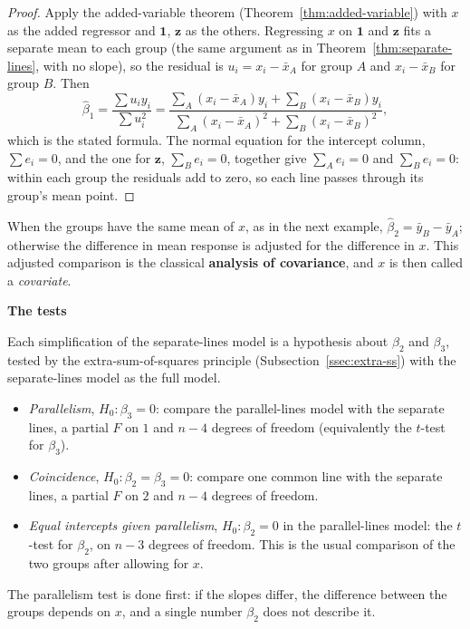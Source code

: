\documentclass[11pt,a4paper]{article}
\numberwithin{equation}{section}
\theoremstyle{definition}
\newcommand{\subhead}[1]{%
  \par\medskip\noindent\textbf{#1}\par\nobreak\smallskip}
\begin{document}
\begin{proof}
Apply the added-variable theorem (Theorem~\ref{thm:added-variable}) with $x$ as the added regressor and
$\mathbf{1}$, $\mathbf{z}$ as the others. Regressing $x$ on $\mathbf{1}$ and $\mathbf{z}$ fits a separate mean to each group
(the same argument as in Theorem~\ref{thm:separate-lines}, with no slope), so the residual is
$u_i = x_i - \bar x_A$ for group $A$ and $x_i - \bar x_B$ for group $B$. Then
\[
\hat\beta_1 = \frac{\sum u_iy_i}{\sum u_i^2} = \frac{\sum_A(x_i - \bar x_A)y_i + \sum_B(x_i - \bar x_B)y_i}{\sum_A(x_i - \bar x_A)^2 + \sum_B(x_i - \bar x_B)^2} ,
\]
which is the stated formula. The normal equation for the intercept column, $\sum e_i = 0$, and the one for
$\mathbf{z}$, $\sum_B e_i = 0$, together give $\sum_A e_i = 0$ and $\sum_B e_i = 0$: within each group the residuals add to
zero, so each line passes through its group's mean point.
\end{proof}

When the groups have the same mean of $x$, as in the next example, $\hat\beta_2 = \bar y_B - \bar y_A$; otherwise the
difference in mean response is adjusted for the difference in $x$. This adjusted comparison is the classical
\textbf{analysis of covariance}, and $x$ is then called a \emph{covariate}.

\subhead{The tests}
Each simplification of the separate-lines model is a hypothesis about $\beta_2$ and $\beta_3$, tested by the
extra-sum-of-squares principle (Subsection~\ref{ssec:extra-ss}) with the separate-lines model as the full model.
\begin{itemize}
\item \emph{Parallelism}, $H_0\colon \beta_3 = 0$: compare the parallel-lines model with the separate lines, a
partial $F$ on $1$ and $n - 4$ degrees of freedom (equivalently the $t$-test for $\beta_3$).
\item \emph{Coincidence}, $H_0\colon \beta_2 = \beta_3 = 0$: compare one common line with the separate lines, a partial
$F$ on $2$ and $n - 4$ degrees of freedom.
\item \emph{Equal intercepts given parallelism}, $H_0\colon \beta_2 = 0$ in the parallel-lines model: the $t$-test for
$\beta_2$, on $n - 3$ degrees of freedom. This is the usual comparison of the two groups after allowing for $x$.
\end{itemize}
The parallelism test is done first: if the slopes differ, the difference between the groups depends on $x$, and
a single number $\beta_2$ does not describe it.
\end{document}
